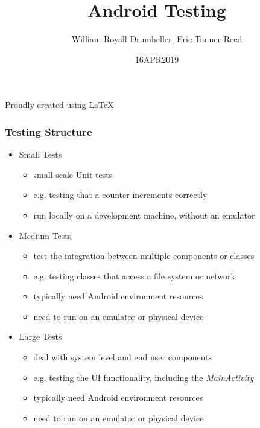 \documentclass[10pt]{beamer}
\title{Android Testing}
\author{William Royall Drumheller, Eric Tanner Reed}
\date{16APR2019}
\begin{document}
\begin{frame}
\titlepage
\begin{center}
Proudly created using \LaTeX
\end{center}
\end{frame}

\begin{frame}
\frametitle{Testing Structure}
\begin{itemize}
    \item Small Tests
        \begin{itemize}
            \item small scale Unit tests
            \item e.g. testing that a counter increments correctly
            \item run locally on a development machine, without an emulator
        \end{itemize}
    \item Medium Tests
        \begin{itemize}
            \item test the integration between multiple components or classes
            \item e.g. testing classes that access a file system or network
            \item typically need Android environment resources
            \item need to run on an emulator or physical device
        \end{itemize}
    \item Large Tests
        \begin{itemize}
            \item deal with system level and end user components
            \item e.g. testing the UI functionality, including the \textit{MainActivity}
            \item typically need Android environment resources
            \item need to run on an emulator or physical device
        \end{itemize}
\end{itemize}
\end{frame}
\end{document}
